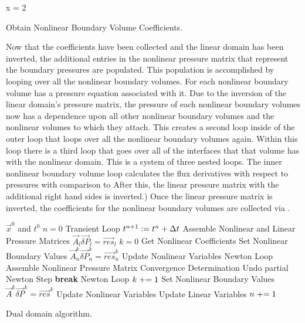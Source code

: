 \begin{algo}[ht!]
\setlength{\baselineskip}{0.625\baselineskip}
\begin{algorithmic}[1]
\Set x = 2
\end{algorithmic}
\caption{Obtain Nonlinear Boundary Volume Coefficients.}
\label{alg:domDecompGetCoef}
\end{algo}

Now that the coefficients have been collected and the linear domain has been inverted, the additional entries in the nonlinear pressure matrix that represent the boundary pressures are populated.
This population is accomplished by looping over all the nonlinear boundary volumes.
For each nonlinear boundary volume  has a pressure equation associated with it.
Due to the inversion of the linear domain's pressure matrix, the pressure of each nonlinear boundary volumes now has a dependence upon all other nonlinear boundary volumes and the nonlinear volumes to which they attach.
This creates a second loop inside of the outer loop that loops over all the nonlinear boundary volumes again.
Within this loop there is a third loop that goes over all of the interfaces that that volume has with the nonlinear domain.
This is a system of three nested loops.
The inner nonlinear boundary volume loop calculates the flux derivatives with respect to pressures with comparison to 
After this, the linear pressure matrix with the additional right hand sides is inverted.)
Once the linear pressure matrix is inverted, the coefficients for the nonlinear boundary volumes are collected via .

\begin{algo}[ht!]
\setlength{\baselineskip}{0.625\baselineskip}
\begin{algorithmic}[1]
\Require $\vec{x}^{0}$ and $t^{0}$
\Set $n = 0$
\Loop \; Transient Loop
    \Set $t^{n+1} : = t^{n} + \dt{}$
	\Algorithm Assemble Nonlinear and Linear Pressure Matrices	 
		\Solve $\vec{A}_{l} \vec{\delta P}_{l} = \vec{res}_{l}$	
	\EndIf
	    \Set $k = 0$
		\Algorithm Get Nonlinear Coefficients 
		\Algorithm Set Nonlinear Boundary Values 
		\Solve $\vec{A}^{k}_{n} \vec{\delta P}_{n}^{k} = \vec{res}_{n}^{k}$	
		\Algorithm Update Nonlinear Variables  
	    \Loop \; Newton Loop
			\Algorithm Assemble Nonlinear Pressure Matrix 
			\Algorithm Convergence Determination 
				\State Undo partial Newton Step
				\State \textbf{break} Newton Loop 
			\EndIf		
			\Set $k \mathrel{+}= 1$
			\Algorithm Set Nonlinear Boundary Values 
			\Solve $\vec{A}^{k} \vec{\delta P}^{k} = \vec{res}^{k}$
			\Algorithm Update Nonlinear Variables 
		\EndLoop
	\EndIf
		\Algorithm Update Linear Variables 
	\EndIf
	\Set $n \mathrel{+}= 1$
\EndLoop
\end{algorithmic}
\caption{Dual domain \cobra{} algorithm.}
\label{alg:domDecompAlgorithm}
\end{algo}

